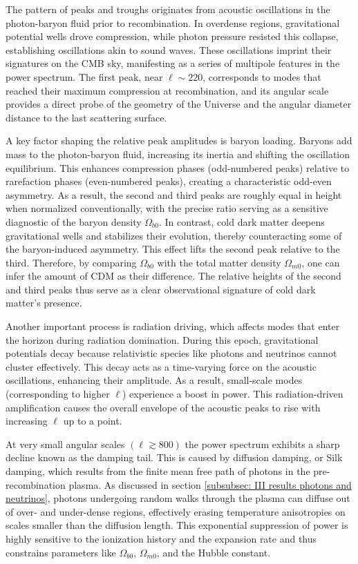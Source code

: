 \documentclass{aa}
\numberwithin{equation}{section}
\numberwithin{table}{section}
\numberwithin{figure}{section}
\begin{document}
The pattern of peaks and troughs originates from acoustic oscillations in the photon-baryon fluid prior to recombination. In overdense regions, gravitational potential wells drove compression, while photon pressure resisted this collapse, establishing oscillations akin to sound waves. These oscillations imprint their signatures on the CMB sky, manifesting as a series of multipole features in the power spectrum. The first peak, near $\ell \sim 220$, corresponds to modes that reached their maximum compression at recombination, and its angular scale provides a direct probe of the geometry of the Universe and the angular diameter distance to the last scattering surface.

A key factor shaping the relative peak amplitudes is baryon loading. Baryons add mass to the photon-baryon fluid, increasing its inertia and shifting the oscillation equilibrium. This enhances compression phases (odd-numbered peaks) relative to rarefaction phases (even-numbered peaks), creating a characteristic odd-even asymmetry. As a result, the second and third peaks are roughly equal in height when normalized conventionally, with the precise ratio serving as a sensitive diagnostic of the baryon density $\Omega_{b0}$. In contrast, cold dark matter deepens gravitational wells and stabilizes their evolution, thereby counteracting some of the baryon-induced asymmetry. This effect lifts the second peak relative to the third. Therefore, by comparing $\Omega_{b0}$ with the total matter density $\Omega_{m0}$, one can infer the amount of CDM as their difference. The relative heights of the second and third peaks thus serve as a clear observational signature of cold dark matter's presence.

Another important process is radiation driving, which affects modes that enter the horizon during radiation domination. During this epoch, gravitational potentials decay because relativistic species like photons and neutrinos cannot cluster effectively. This decay acts as a time-varying force on the acoustic oscillations, enhancing their amplitude. As a result, small-scale modes (corresponding to higher $\ell$) experience a boost in power. This radiation-driven amplification causes the overall envelope of the acoustic peaks to rise with increasing $\ell$ up to a point.

At very small angular scales $(\ell\gtrsim800)$ the power spectrum exhibits a sharp decline known as the damping tail. This is caused by diffusion damping, or Silk damping, which results from the finite mean free path of photons in the pre-recombination plasma. As discussed in section \ref{subsubsec: III results photons and neutrinos}, photons undergoing random walks through the plasma can diffuse out of over- and under-dense regions, effectively erasing temperature anisotropies on scales smaller than the diffusion length. This exponential suppression of power is highly sensitive to the ionization history and the expansion rate and thus constrains parameters like $\Omega_{b0}$, $\Omega_{m0}$, and the Hubble constant.
\end{document}
